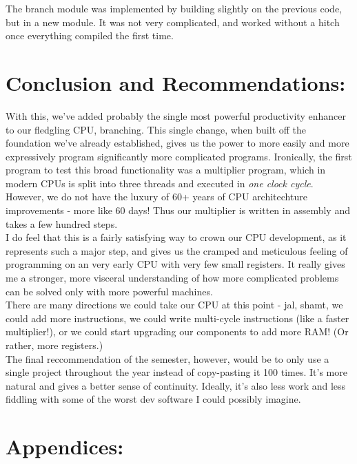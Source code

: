 \documentclass[12pt,a4paper]{article}
\begin{document}
The branch module was implemented by building slightly on the previous code, but in
a new module. It was not very complicated, and worked without a hitch once everything
compiled the first time.


\section*{Conclusion and Recommendations:}

With this, we've added probably the single most powerful productivity enhancer
to our fledgling CPU, branching. This single change, when built off the foundation
we've already established, gives us the power to more easily and more expressively
program significantly more complicated programs. Ironically, the first program to
test this broad functionality was a multiplier program, which in modern CPUs is
split into three threads and executed in \emph{one clock cycle}. However, we do
not have the luxury of 60+ years of CPU architechture improvements - more like 60 days!
Thus our multiplier is written in assembly and takes a few hundred steps. \\

I do feel that this is a fairly satisfying way to crown our CPU development, as
it represents such a major step, and gives us the cramped and meticulous feeling
of programming on an very early CPU with very few small registers. It really gives
me a stronger, more visceral understanding of how more complicated problems can be solved only
with more powerful machines. \\

There are many directions we could take our CPU at this point - jal, shamt, we could add
more instructions, we could write multi-cycle instructions (like a faster multiplier!),
or we could start upgrading our components to add more RAM! (Or rather, more registers.) \\

The final reccommendation of the semester, however, would be to only use a single project
throughout the year instead of copy-pasting it 100 times. It's more natural and gives
a better sense of continuity. Ideally, it's also less work and less fiddling with some
of the worst dev software I could possibly imagine.


\newpage
\section*{Appendices:}
\end{document}
